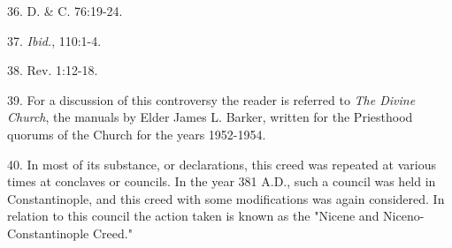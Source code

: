 36. D. \& C. 76:19-24.

37. \textit{Ibid.}, 110:1-4.

38. Rev. 1:12-18.

39. For a discussion of this controversy the reader is referred to \textit{The Divine Church}, the
manuals by Elder James L. Barker, written for the Priesthood quorums of the Church for the
years 1952-1954.

40. In most of its substance, or declarations, this creed was repeated at various times at
conclaves or councils. In the year 381 A.D., such a council was held in Constantinople, and
this creed with some modifications was again considered. In relation to this council the
action taken is known as the "Nicene and Niceno-Constantinople Creed."

